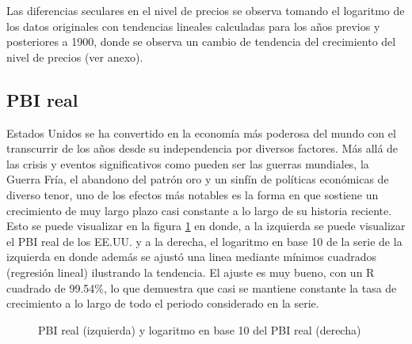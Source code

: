 \documentclass[a4paper]{article}
\begin{document}
Las diferencias seculares en el nivel de precios se observa tomando el logaritmo de los datos originales con tendencias lineales calculadas para los años previos y posteriores a 1900, donde se observa un cambio de tendencia del crecimiento del nivel de precios (ver anexo).

\subsection{PBI real}
Estados Unidos se ha convertido en la economía más poderosa del mundo con el transcurrir de los años desde su independencia por diversos factores. Más allá de las crisis y eventos significativos como pueden ser las guerras mundiales, la Guerra Fría, el abandono del patrón oro y un sinfín de políticas económicas de diverso tenor, uno de los efectos más notables es la forma en que sostiene un crecimiento de muy largo plazo casi constante a lo largo de su historia reciente. Esto se puede visualizar en la figura \ref{fig:PBI_orig} en donde, a la izquierda se puede visualizar el PBI real de los EE.UU. y a la derecha, el logaritmo en base 10 de la serie de la izquierda en donde además se ajustó una linea mediante mínimos cuadrados (regresión lineal) ilustrando la tendencia. El ajuste es muy bueno, con un R cuadrado de 99.54\%, lo que demuestra que casi se mantiene constante la tasa de crecimiento a lo largo de todo el periodo considerado en la serie.

\begin{figure}[H]
	\centering
	\caption{PBI real (izquierda) y logaritmo en base 10 del PBI real (derecha)} 	
	\label{fig:PBI_orig}
\end{figure}
\end{document}
